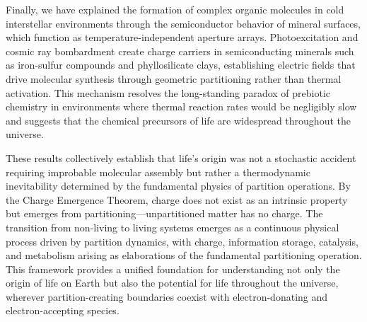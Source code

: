 \documentclass[12pt,a4paper]{article}
\begin{document}
Finally, we have explained the formation of complex organic molecules in cold interstellar environments through the semiconductor behavior of mineral surfaces, which function as temperature-independent aperture arrays. Photoexcitation and cosmic ray bombardment create charge carriers in semiconducting minerals such as iron-sulfur compounds and phyllosilicate clays, establishing electric fields that drive molecular synthesis through geometric partitioning rather than thermal activation. This mechanism resolves the long-standing paradox of prebiotic chemistry in environments where thermal reaction rates would be negligibly slow and suggests that the chemical precursors of life are widespread throughout the universe.

These results collectively establish that life's origin was not a stochastic accident requiring improbable molecular assembly but rather a thermodynamic inevitability determined by the fundamental physics of partition operations. By the Charge Emergence Theorem, charge does not exist as an intrinsic property but emerges from partitioning---unpartitioned matter has no charge. The transition from non-living to living systems emerges as a continuous physical process driven by partition dynamics, with charge, information storage, catalysis, and metabolism arising as elaborations of the fundamental partitioning operation. This framework provides a unified foundation for understanding not only the origin of life on Earth but also the potential for life throughout the universe, wherever partition-creating boundaries coexist with electron-donating and electron-accepting species.




\end{document}
